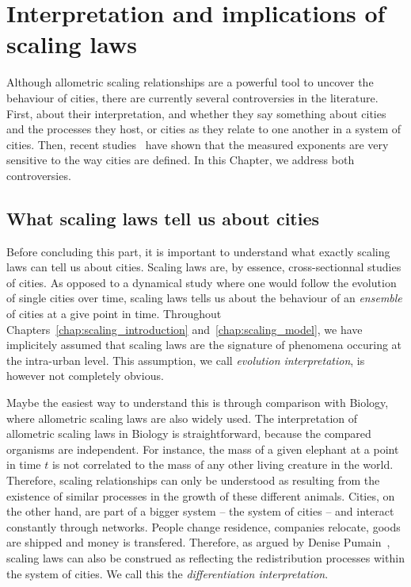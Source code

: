 \chapter{Interpretation and implications of scaling laws}
\label{chap:scaling_implications}

\bigskip

Although allometric scaling relationships are a powerful tool to uncover the
behaviour of cities, there are currently several controversies in the
literature. First, about their interpretation, and whether they say
something about cities and the processes they host, or cities as they relate to
one another in a system of cities. Then, recent
studies~\cite{Arcaute:2014,Louf:2014_mobility} have shown that the measured
exponents are very sensitive to the way cities are defined. In this Chapter, we
address both controversies.

\section{What scaling laws tell us about cities}

Before concluding this part, it is important to understand what exactly scaling
laws can tell us about cities. Scaling laws are, by essence, cross-sectionnal
studies of cities. As opposed to a dynamical study where one would follow the
evolution of single cities over time, scaling laws tells us about the behaviour
of an \emph{ensemble} of cities at a give point in time. Throughout
Chapters~\ref{chap:scaling_introduction} and~\ref{chap:scaling_model}, we have
implicitely assumed that scaling laws are the signature of phenomena occuring at
the intra-urban level. This assumption, we call \emph{evolution interpretation},
is however not completely obvious. 

Maybe the easiest way to understand this is through comparison with
Biology, where allometric scaling laws are also widely used. The interpretation
of allometric scaling laws in Biology is straightforward, because the compared
organisms are independent. For instance, the mass of a given elephant at a point in
time $t$ is not correlated to the mass of any other living creature in the
world. Therefore, scaling relationships can only be understood as resulting from
the existence  of similar processes in the growth of these different animals.
Cities, on the other hand, are part of a bigger system -- the system of cities
-- and interact constantly through networks.  People change residence, companies
relocate, goods are shipped and money is transfered. Therefore, as argued by
Denise Pumain~\cite{Pumain:2012}, scaling laws can also be construed as
reflecting the redistribution processes within the system of cities. We call
this the \emph{differentiation interpretation}.

